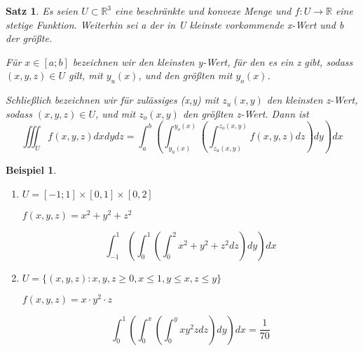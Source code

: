 \documentclass[12pt,a4paper]{scrreprt}
\newtheorem{beispiel}[defi]{Beispiel}
\newtheorem{satz}[defi]{Satz}
\begin{document}
	\begin{satz}
		Es seien $U\subset\mathbb{R}^3$ eine beschränkte und konvexe Menge und $f:U\to\mathbb{R}$ eine stetige Funktion. Weiterhin sei a der in U kleinste vorkommende x-Wert und b der größte.

		Für $x\in[a;b]$ bezeichnen wir den kleinsten y-Wert, für den es ein z gibt, sodass $(x,y,z)\in U$ gilt, mit $y_u(x)$, und den größten mit $y_o(x)$.

		Schließlich bezeichnen wir für zulässiges (x,y) mit $z_u(x,y)$ den kleinsten z-Wert, sodass $(x,y,z)\in U$, und mit $z_o(x,y)$ den größten z-Wert. Dann ist
		\[\iiint_U f(x,y,z)dxdydz=\int_a^b \left(\int_{y_u(x)}^{y_o(x)} \left(\int_{z_u(x,y)}^{z_o(x,y)} f(x,y,z)dz\right)dy\right)dx\]
	\end{satz}

	\begin{beispiel}
		\begin{enumerate}[label=\emph{(\roman*)}]
			\item $U=[-1;1]\times[0,1]\times[0,2]$
			
			$f(x,y,z)=x^2+y^2+z^2$

			$$\int_{-1}^1 \left(\int_0^1 \left(\int_0^2 x^2+y^2+z^2dz \right)dy \right)dx$$

			\item $U=\{(x,y,z):x,y,z \ge 0,x \le 1,y \le x,z \le y\}$
			
			$f(x,y,z)=x\cdot y^2 \cdot z$
			
			$$\int_0^1 \left(\int_0^x \left(\int_0^y xy^2zdz \right)dy \right)dx=\frac{1}{70}$$
		\end{enumerate}
	\end{beispiel}
\end{document}
